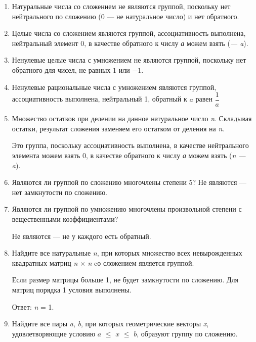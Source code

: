 \documentclass[12pt]{article}
\begin{document}
\begin{enumerate}
    \item
          Натуральные числа со сложением не являются группой, поскольку нет
          нейтрального по сложению (0 --- не натуральное число) и нет обратного.
    \item
          Целые числа со сложением являются группой, ассоциативность выполнена,
          нейтральный элемент 0, в качестве обратного к числу \emph{а} можем
          взять (\emph{--- a}).
    \item
          Ненулевые целые числа с умножением не являются группой, поскольку нет
          обратного для чисел, не равных $1$ или $-1$.
    \item
          Ненулевые рациональные числа с умножением являются группой,
          ассоциативность выполнена, нейтральный 1, обратный к $a$ равен $\dfrac{1}{a}$

    \item
          Множество остатков при делении на данное натуральное число \emph{n}.
          Складывая остатки, результат сложения заменяем его остатком от деления
          на \emph{n}.

          Это группа, поскольку ассоциативность выполнена, в качестве нейтрального
          элемента можем взять 0, в качестве обратного к числу \emph{а} можем
          взять (\emph{n --- a}).

    \item
          Являются ли группой по сложению многочлены степени 5? Не являются ---
          нет замкнутости по сложению.
    \item
          Являются ли группой по умножению многочлены произвольной степени с
          вещественными коэффициентами?

          Не являются --- не у каждого есть обратный.

    \item
          Найдите все натуральные \emph{n}, при которых множество всех
          невырожденных квадратных матриц \emph{n} $\times$ \emph{n} cо сложением
          является группой.

          Если размер матрицы больше 1, не будет замкнутости по сложению. Для
          матриц порядка 1 условия выполнены.

          Ответ: \emph{n} = 1.

    \item
          Найдите все пары \emph{a}, \emph{b}, при которых геометрические
          векторы \emph{x}, удовлетворяющие условию $a$ $\leq$ $x$ $\leq$ $b$, образуют группу
          по сложению.


\end{enumerate}
\end{document}
